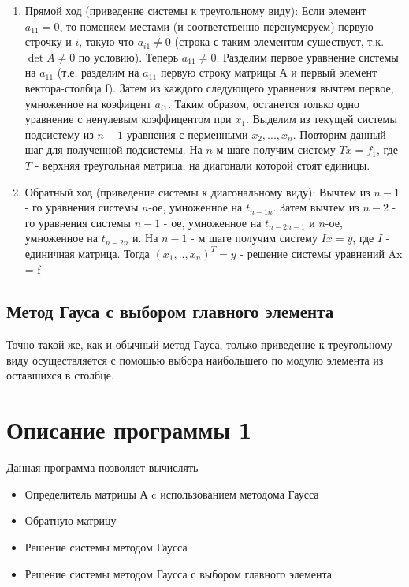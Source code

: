 \documentclass[a4paper,12pt,titlepage,finall]{article}
\begin{document}
\begin{enumerate}
    \item Прямой ход (приведение системы к треугольному виду): Если элемент $a_{11} = 0$, то поменяем местами (и соответственно перенумеруем) первую строчку и $i$, такую что $a_{i1} \neq 0$ (строка с таким элементом существует, т.к. $\det{A} \neq 0$ по условию). Теперь  $a_{11} \neq 0$. Разделим первое уравнение системы на $a_{11}$ (т.е. разделим на $a_{11}$ первую строку матрицы А и первый элемент вектора-столбца f). Затем из каждого следующего уравнения вычтем первое, умноженное на коэфицент $a_{i1}$. Таким образом, останется только одно уравнение с ненулевым коэффицентом при $x_{1}$. Выделим из текущей системы подсистему из $n - 1$ уравнения с перменными $x_{2}, ..., x_{n}$. Повторим данный шаг для полученной подсистемы. На $n$-м шаге получим систему $Tx=f_{1}$, где $T$ - верхняя треугольная матрица, на диагонали которой стоят единицы.
    
    \item Обратный ход (приведение системы к диагональному виду): Вычтем из $n-1$ - го уравнения системы $n$-ое, умноженное на $ t_{n-1n}$. Затем вычтем из $n-2$ - го уравнения системы $n-1$ - ое, умноженное на $t_{n-2n-1}$ и $n$-ое, умноженное на $ t_{n-2n}$ и. На $n-1$ - м шаге получим систему $Ix=y$, где $I$ - единичная матрица. Тогда $(x_{1},.., x_{n})^{T} = y$ - решение системы уравнений Ax = f
\end{enumerate}

\subsection{Метод Гауса с выбором главного элемента}
Точно такой же, как и обычный метод Гауса, только приведение к треугольному виду осуществляется с помощью выбора наибольшего по модулю элемента из оставшихся в столбце.

\newpage
\section{Описание программы 1}
Данная программа позволяет вычислять
\begin{itemize}
    \item Определитель матрицы А c использованием методома Гаусса
    \item Обратную матрицу
    \item Решение системы методом Гаусса
    \item Решение системы методом Гаусса с выбором главного элемента
\end{itemize}
\end{document}

